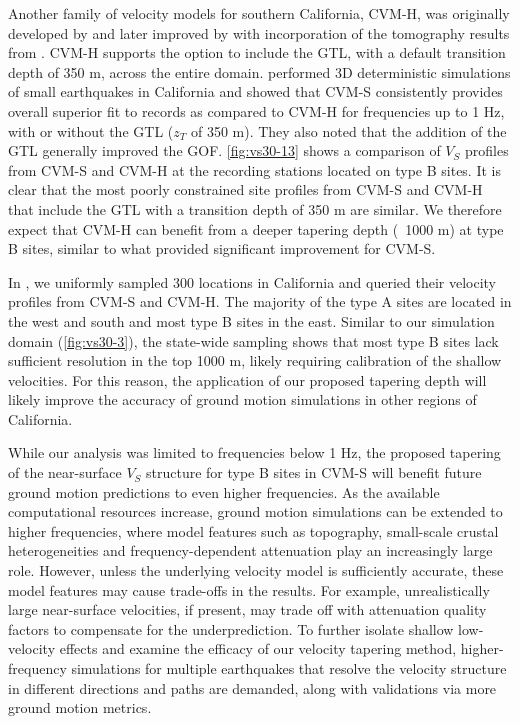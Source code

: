 Another family of velocity models for southern California, CVM-H, was originally developed by \citet{sussWaveSeismicVelocity2003} and later improved by \citet{pleschNewVelocityModel2007,pleschCVMHInversionIntegration2009,pleschUpdatesCVMHIncluding2017} with incorporation of the tomography results from \citet{tapeAdjointTomographySouthern2009, tapeSeismicTomographySouthern2010}. CVM-H supports the option to include the \citet{elyVs30derivedNearsurfaceSeismic2010} GTL, with a default transition depth of 350 m, across the entire domain. \citet{tabordaEvaluationSouthernCalifornia2016} performed 3D deterministic simulations of small earthquakes in California and showed that CVM-S consistently provides overall superior fit to records as compared to CVM-H for frequencies up to 1 Hz, with or without the \citet{elyVs30derivedNearsurfaceSeismic2010} GTL ($z_T$ of 350 m). They also noted that the addition of the \citet{elyVs30derivedNearsurfaceSeismic2010} GTL generally improved the GOF. \cref{fig:vs30-13} shows a comparison of $V_S$ profiles from CVM-S and CVM-H at the recording stations located on type B sites. It is clear that the most poorly constrained site profiles from CVM-S and CVM-H that include the \citet{elyVs30derivedNearsurfaceSeismic2010} GTL with a transition depth of 350 m are similar. We therefore expect that CVM-H can benefit from a deeper tapering depth (~1000 m) at type B sites, similar to what provided significant improvement for CVM-S.

In , we uniformly sampled 300 locations in California and queried their velocity profiles from CVM-S and CVM-H. The majority of the type A sites are located in the west and south and most type B sites in the east. Similar to our simulation domain (\cref{fig:vs30-3}), the state-wide sampling shows that most type B sites lack sufficient resolution in the top 1000 m, likely requiring calibration of the shallow velocities. For this reason, the application of our proposed tapering depth will likely improve the accuracy of ground motion simulations in other regions of California.

While our analysis was limited to frequencies below 1 Hz, the proposed tapering of the near-surface $V_S$ structure for type B sites in CVM-S will benefit future ground motion predictions to even higher frequencies. As the available computational resources increase, ground motion simulations can be extended to higher frequencies, where model features such as topography, small-scale crustal heterogeneities and frequency-dependent attenuation play an increasingly large role. However, unless the underlying velocity model is sufficiently accurate, these model features may cause trade-offs in the results. For example, unrealistically large near-surface velocities, if present, may trade off with attenuation quality factors to compensate for the underprediction. To further isolate shallow low-velocity effects and examine the efficacy of our velocity tapering method, higher-frequency simulations for multiple earthquakes that resolve the velocity structure in different directions and paths are demanded, along with validations via more ground motion metrics.


